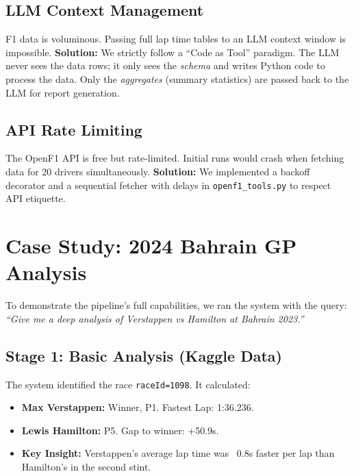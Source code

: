 \documentclass[11pt]{article}
\begin{document}
\subsection{LLM Context Management}
F1 data is voluminous. Passing full lap time tables to an LLM context window is impossible.
\textbf{Solution:} We strictly follow a ``Code as Tool'' paradigm. The LLM never sees the data rows; it only sees the \textit{schema} and writes Python code to process the data. Only the \textit{aggregates} (summary statistics) are passed back to the LLM for report generation.

\subsection{API Rate Limiting}
The OpenF1 API is free but rate-limited. Initial runs would crash when fetching data for 20 drivers simultaneously.
\textbf{Solution:} We implemented a backoff decorator and a sequential fetcher with delays in \texttt{openf1\_tools.py} to respect API etiquette.

\section{Case Study: 2024 Bahrain GP Analysis}

To demonstrate the pipeline's full capabilities, we ran the system with the query: \textit{“Give me a deep analysis of Verstappen vs Hamilton at Bahrain 2023.”}

\subsection{Stage 1: Basic Analysis (Kaggle Data)}
The system identified the race \texttt{raceId=1098}. It calculated:
\begin{itemize}
    \item \textbf{Max Verstappen:} Winner, P1. Fastest Lap: 1:36.236.
    \item \textbf{Lewis Hamilton:} P5. Gap to winner: +50.9s.
    \item \textbf{Key Insight:} Verstappen's average lap time was ~0.8s faster per lap than Hamilton's in the second stint.
\end{itemize}
\end{document}
